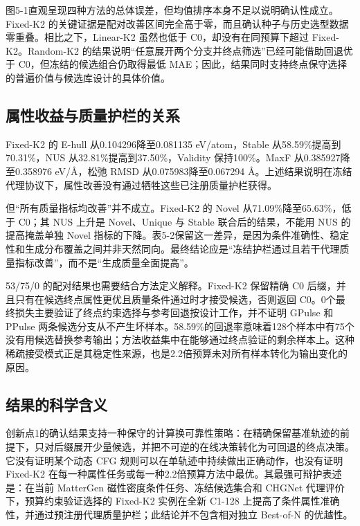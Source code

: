 图5-1直观呈现四种方法的总体误差，但均值排序本身不足以说明确认性成立。Fixed-K2 的关键证据是配对改善区间完全高于零，而且确认种子与历史选型数据零重叠。相比之下，Linear-K2 虽然也低于 C0，却没有在同预算下超过 Fixed-K2。Random-\allowbreak K2 的结果说明``任意展开两个分支并终点筛选''已经可能借助回退优于 C0，但冻结的候选组合仍取得最低 MAE；因此，结果同时支持终点保守选择的普遍价值与候选库设计的具体价值。

\subsection{属性收益与质量护栏的关系}

Fixed-K2 的 E-hull 从0.104296降至0.081135 eV/atom，Stable 从58.59\%提高到70.31\%，NUS 从32.81\%提高到37.50\%，Validity 保持100\%。MaxF 从0.385927降至0.358976 eV/Å，松弛 RMSD 从0.075983降至0.067294 Å。上述结果说明在冻结代理协议下，属性改善没有通过牺牲这些已注册质量护栏获得。

但``所有质量指标均改善''并不成立。Fixed-K2 的 Novel 从71.09\%降至65.63\%，低于 C0；其 NUS 上升是 Novel、Unique 与 Stable 联合后的结果，不能用 NUS 的提高掩盖单独 Novel 指标的下降。表5-2保留这一差异，是因为条件准确性、稳定性和生成分布覆盖之间并非天然同向。最终结论应是``冻结护栏通过且若干代理质量指标改善''，而不是``生成质量全面提高''。

53/75/0 的配对结果也需要结合方法定义解释。Fixed-K2 保留精确 C0 后缀，并且只有在候选终点属性更优且质量条件通过时才接受候选，否则返回 C0。0个最终损失主要验证了终点约束选择与参考回退按设计工作，并不证明 GPulse 和 PPulse 两条候选分支从不产生坏样本。58.59\%的回退率意味着128个样本中有75个没有用候选替换参考输出；方法收益集中在能够通过终点验证的剩余样本上。这种稀疏接受模式正是其稳定性来源，也是2.2倍预算未对所有样本转化为输出变化的原因。

\subsection{结果的科学含义}

创新点1的确认结果支持一种保守的计算换可靠性策略：在精确保留基准轨迹的前提下，只对后缀展开少量候选，并把不可逆的在线决策转化为可回退的终点决策。它没有证明某个动态 CFG 规则可以在单轨迹中持续做出正确动作，也没有证明 Fixed-K2 在每一种属性任务或每一种2.2倍预算方法中最优。其最强可辩护表述是：在当前 MatterGen 磁性密度条件任务、冻结候选集合和 CHGNet 代理评价下，预算约束验证选择的 Fixed-K2 实例在全新 C1-128 上提高了条件属性准确性，并通过预注册代理质量护栏；此结论并不包含相对独立 Best-of-N 的优越性。

